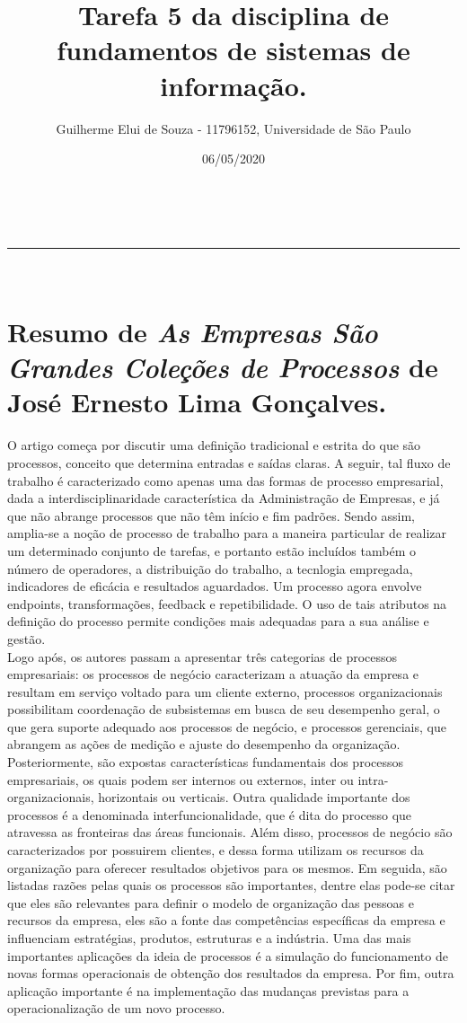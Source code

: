 \documentclass[a4paper,12pt]{article}
\makeatletter
\newcommand{\linia}{\rule{\linewidth}{0.5pt}}
\renewcommand{\maketitle}{
\begin{center}
\vspace{2ex}
{\huge \textsc{\@title}}
\vspace{1ex}
\\
\linia\\
\@author \hfill \@date
\vspace{4ex}
\end{center}
}
\makeatother
\begin{document}
\title{Tarefa 5 da disciplina de fundamentos de sistemas de informação.}

\author{Guilherme Elui de Souza - 11796152, Universidade de São Paulo}

\date{06/05/2020}

\maketitle

\section*{Resumo de \textit{As Empresas São Grandes Coleções de Processos} de José Ernesto Lima Gonçalves.}

O artigo começa por discutir uma definição tradicional e estrita do que são processos, conceito que determina entradas e saídas claras. A seguir, tal fluxo de trabalho é caracterizado como apenas uma das formas de processo empresarial, dada a interdisciplinaridade característica da Administração de Empresas, e já que não abrange processos que não têm início e fim padrões. Sendo assim, amplia-se a noção de processo de trabalho para a maneira particular de realizar um determinado conjunto de tarefas, e portanto estão incluídos também o número de operadores, a distribuição do trabalho, a tecnlogia empregada, indicadores de eficácia e resultados aguardados. Um processo agora envolve endpoints, transformações, feedback e repetibilidade. O uso de tais atributos na definição do processo permite condições mais adequadas para a sua análise e gestão.
\\     \indent Logo após, os autores passam a apresentar três categorias de processos empresariais: os processos de negócio caracterizam a atuação da empresa e resultam em serviço voltado para um cliente externo, processos organizacionais possibilitam coordenação de subsistemas em busca de seu desempenho geral, o que gera suporte adequado aos processos de negócio, e processos gerenciais, que abrangem as ações de medição e ajuste do desempenho da organização.
\\     \indent Posteriormente, são expostas características fundamentais dos processos empresariais, os quais podem ser internos ou externos, inter ou intra-organizacionais, horizontais ou verticais. Outra qualidade importante dos processos é a denominada interfuncionalidade, que é dita do processo que atravessa as fronteiras das áreas funcionais. Além disso, processos de negócio são caracterizados por possuirem clientes, e dessa forma utilizam os recursos da organização para oferecer resultados objetivos para os mesmos. Em seguida, são listadas razões pelas quais os processos são importantes, dentre elas pode-se citar que eles são relevantes para definir o modelo de organização das pessoas e recursos da empresa, eles são a fonte das competências específicas da empresa e influenciam estratégias, produtos, estruturas e a indústria. Uma das mais importantes aplicações da ideia de processos é a simulação do funcionamento de novas formas operacionais de obtenção dos resultados da empresa. Por fim, outra aplicação importante é na implementação das mudanças previstas para a operacionalização de um novo processo.
\end{document}
